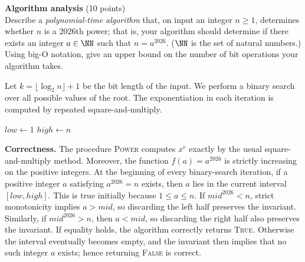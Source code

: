\begin{problem}{\bf Algorithm analysis} (10 points)\\
Describe a \emph{polynomial-time algorithm} that, on input an integer
$n \geq 1$, determines whether $n$ is a 2026th power; that is, your
algorithm should determine if there exists an integer $a \in \NN$ such
that $n = a^{2026}$. ($\NN$ is the set of natural numbers.)
Using big-O notation, give an upper bound on the number of bit operations
your algorithm takes.
\end{problem}

\begin{loigiai}
Let \(
k=\lfloor \log_2 n\rfloor+1
\)
be the bit length of the input.  We perform a binary search over all
possible values of the root.  The exponentiation in each iteration is
computed by repeated square-and-multiply.

\begingroup
{}
\begin{algorithm}[H]
\caption{Testing whether $n$ is a 2026th power}


$low\gets 1$\;
$high\gets n$\;
\;
\end{algorithm}
\endgroup

\textbf{Correctness.}
The procedure \textsc{Power} computes $x^e$ exactly by the usual
square-and-multiply method.  Moreover, the function
$f(a)=a^{2026}$ is strictly increasing on the positive integers.
At the beginning of every binary-search iteration, if a positive
integer $a$ satisfying $a^{2026}=n$ exists, then $a$ lies in the
current interval $[low,high]$.  This is true initially because
$1\leq a\leq n$.  If $mid^{2026}<n$, strict monotonicity implies
$a>mid$, so discarding the left half preserves the invariant.
Similarly, if $mid^{2026}>n$, then $a<mid$, so discarding the right
half also preserves the invariant.  If equality holds, the algorithm
correctly returns \textsc{True}.  Otherwise the interval eventually
becomes empty, and the invariant then implies that no such integer
$a$ exists; hence returning \textsc{False} is correct.


\end{loigiai}
